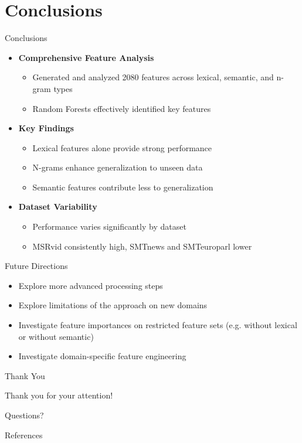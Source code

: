 \documentclass{beamer}
\begin{document}
\section{Conclusions}
\begin{frame}{Conclusions}
    \begin{itemize}
        \item \textbf{Comprehensive Feature Analysis}
        \begin{itemize}
            \item Generated and analyzed 2080 features across lexical, semantic, and n-gram types
            \item Random Forests effectively identified key features
        \end{itemize}
        \item \textbf{Key Findings}
        \begin{itemize}
            \item Lexical features alone provide strong performance
            \item N-grams enhance generalization to unseen data
            \item Semantic features contribute less to generalization
        \end{itemize}
        \item \textbf{Dataset Variability}
        \begin{itemize}
            \item Performance varies significantly by dataset
            \item MSRvid consistently high, SMTnews and SMTeuroparl lower
        \end{itemize}
    \end{itemize}
\end{frame}

\begin{frame}{Future Directions}
    \begin{itemize}
        \item Explore more advanced processing steps
        \item Explore limitations of the approach on new domains
        \item Investigate feature importances on restricted feature sets (e.g. without lexical or without semantic)
        \item Investigate domain-specific feature engineering
    \end{itemize}
\end{frame}

\begin{frame}{Thank You}
    \begin{center}
        \vspace{2em}
        \Large Thank you for your attention!
        \vspace{2em}
        
        Questions?
    \end{center}
\end{frame}


\begin{frame}{References}
    
\end{frame}
\end{document}
